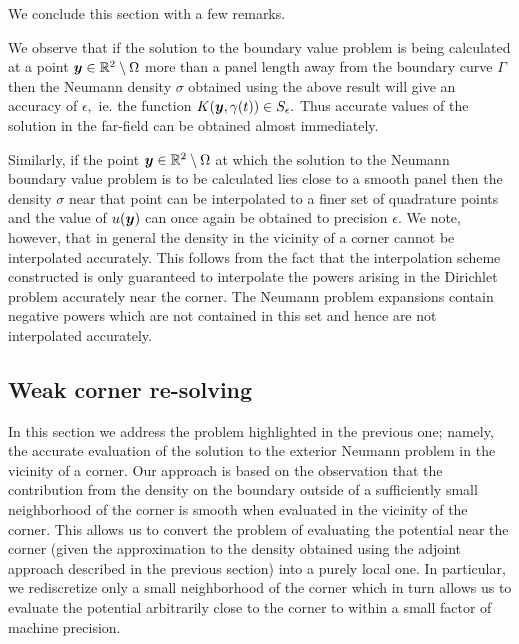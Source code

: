 We conclude this section with a few remarks. 

\begin{remark1}
We observe that if the solution to the boundary value problem is being calculated at a point $\boldsymbol{y} \in \mathbb{R}^2\setminus \Omega$ more than a panel length away from the boundary curve $\Gamma$ then the Neumann density $\sigma$ obtained using the above result will give an accuracy of $\epsilon,$ ie. the function $K(\boldsymbol{y},\gamma(t)) \in S_\epsilon.$ Thus accurate values of the solution in the far-field can be obtained almost immediately.
\end{remark1}
\begin{remark1}
Similarly, if the point $\boldsymbol{y} \in \mathbb{R}^2 \setminus \Omega$ at which the solution to the Neumann boundary value problem is to be calculated lies close to a smooth panel then the density $\sigma$ near that point can be interpolated to a finer set of quadrature points and the value of $u(\boldsymbol{y})$ can once again be obtained to precision $\epsilon.$ We note, however, that in general the density in the vicinity of a corner cannot be interpolated accurately. This follows from the fact that the interpolation scheme constructed is only guaranteed to interpolate the powers arising in the Dirichlet problem accurately near the corner. The Neumann problem expansions contain negative powers which are not contained in this set and hence are not interpolated accurately.
\end{remark1}

\subsection{Weak corner re-solving}
In this section we address the problem highlighted in the previous one; namely, the accurate evaluation of the solution to the exterior Neumann problem in the vicinity of a corner. Our approach is based on the observation that the contribution from the density on the boundary outside of a sufficiently small neighborhood of the corner is smooth when evaluated in the vicinity of the corner. This allows us to convert the problem of evaluating the potential near the corner (given the approximation to the density obtained using the adjoint approach described in the previous section) into a purely local one. In particular, we rediscretize only a small neighborhood of the corner which in turn allows us to evaluate the potential arbitrarily close to the corner to within a small factor of machine precision. 

